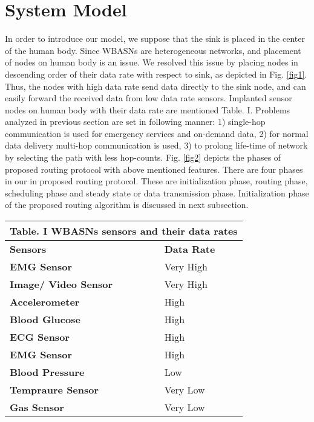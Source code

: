 \documentclass[journal]{IEEEtran}
\begin{document}
\section{System Model}
In order to introduce our model, we suppose that the sink is placed in the center of the human body. Since WBASNs are heterogeneous networks, and placement of nodes on human body is an issue. We resolved this issue by placing nodes in descending order of their data rate with respect to sink, as depicted in Fig. \ref{fig1}. Thus, the nodes with high data rate send data directly to the sink node, and can easily forward the received data from low data rate sensors. Implanted sensor nodes on human body with their data rate are mentioned Table. I. Problems analyzed in previous section are set in following manner: 1) single-hop communication is used for emergency services and on-demand data, 2) for normal data delivery multi-hop communication is used, 3) to prolong life-time of network by selecting the path with less hop-counts. Fig. \ref{fig2} depicts the phases of proposed routing protocol with above mentioned features. There are four phases in our in proposed routing protocol. These are initialization phase, routing phase, scheduling phase and steady state or data transmission phase. Initialization phase of the proposed routing algorithm is discussed in next subsection.


\begin{table}[!ht]
\begin{center}
\begin{tabular}{| p{3cm} || p{3cm} |}
   \multicolumn{2}{c}{Table. I WBASNs sensors and their data rates}\\
  \hline
  \textbf{Sensors}                & \textbf{Data Rate}   \\ \hline \hline
   \textbf{EMG Sensor}            &  Very High	 \\ \hline
    \textbf{Image/ Video Sensor}  & Very High	 \\ \hline
     \textbf{Accelerometer}       & High \\ \hline
     \textbf{Blood Glucose}       & High	 \\ \hline
     \textbf{ECG Sensor}	      & High	 \\ \hline
      \textbf{EMG Sensor}         & High	 \\ \hline
      \textbf{Blood Pressure}     & Low	 \\ \hline
       \textbf{Tempraure Sensor}  & Very Low	 \\ \hline
      \textbf{ Gas Sensor}& Very Low	 \\ \hline
\end{tabular}
\end{center}
\end{table}
\end{document}
